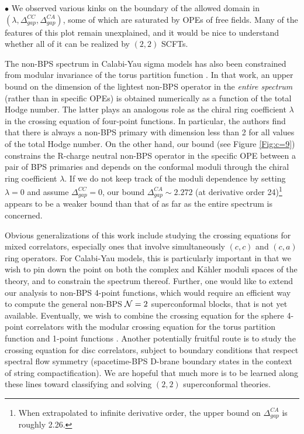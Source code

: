 \documentclass[12pt]{article}
\begin{document}
\noindent $\bullet$ We observed various kinks on the boundary of the allowed domain in $(\lambda,  \Delta^{CC}_{gap},\Delta^{CA}_{gap})$, some of which are saturated by OPEs of free fields. Many of the features of this plot remain unexplained, and it would be nice to understand whether all of it can be realized by $(2,2)$ SCFTs.

The non-BPS spectrum in Calabi-Yau sigma models has also been constrained from  modular invariance of the torus partition function \cite{Keller:2012mr}.  In that work, an upper bound on the dimension of the lightest non-BPS operator in the \textit{entire spectrum} (rather than in specific OPEs) is obtained numerically as a function of the total Hodge number. The latter plays an analogous role as the chiral ring coefficient $\lambda$ in the crossing equation of four-point functions. In particular, the authors find that there is always a non-BPS primary with dimension less than 2 for all values of the total Hodge number.  On the other hand, our bound (see Figure \ref{Fig:c=9}) constrains the R-charge neutral non-BPS operator in the specific OPE  between a pair of BPS primaries and depends on the conformal moduli through the chiral ring coefficient $\lambda$.  If we do not keep track of the moduli dependence by setting $\lambda=0$ and assume $\Delta^{CC}_{gap}=0$, our bound $\Delta^{CA}_{gap}\sim 2.272$ (at derivative order 24)\footnote{When extrapolated to infinite derivative order, the upper bound on $\Delta^{CA}_{gap}$ is roughly 2.26.} appears to be a weaker bound than that of \cite{Keller:2012mr} as far as the entire spectrum is concerned.



Obvious generalizations of this work include studying the crossing equations for mixed correlators, especially ones that involve simultaneously $(c,c)$ and $(c,a)$ ring operators. For Calabi-Yau models, this is particularly important in that we wish to pin down the point on both the complex and K\"ahler moduli spaces of the theory, and to constrain the spectrum thereof. Further, one would like to extend our analysis to non-BPS 4-point functions, which would require an efficient way to compute the general non-BPS ${\cal N}=2$ superconformal blocks, that is not yet available. Eventually, we wish to combine the crossing equation for the sphere 4-point correlators with the modular crossing equation for the torus partition function and 1-point functions \cite{Hellerman:2009bu, Keller:2012mr, Friedan:2013cba, Qualls:2013eha,Collier:2016cls}. Another potentially fruitful route is to study the crossing equation for disc correlators, subject to boundary conditions that respect spectral flow symmetry (spacetime-BPS D-brane boundary states in the context of string compactification). We are hopeful that much more is to be learned along these lines toward classifying and solving $(2,2)$ superconformal theories.
\end{document}
